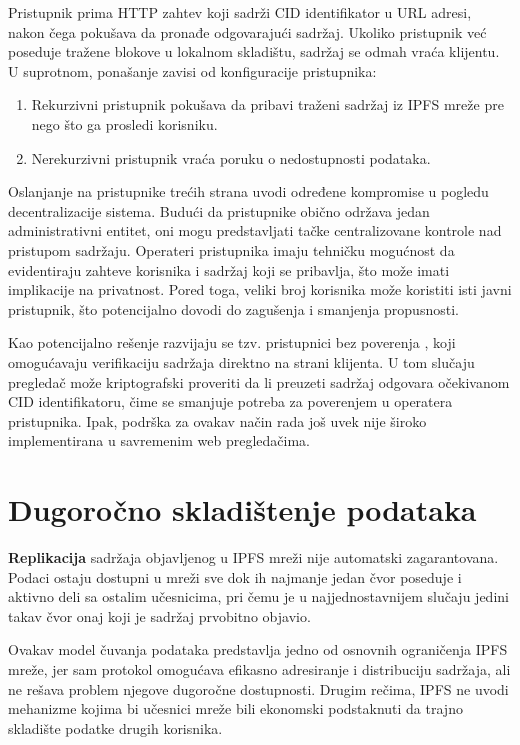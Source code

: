 Pristupnik prima HTTP zahtev koji sadrži CID identifikator u URL adresi, nakon čega pokušava da pronađe odgovarajući sadržaj. Ukoliko pristupnik već poseduje tražene blokove u lokalnom skladištu, sadržaj se odmah vraća klijentu. U suprotnom, ponašanje zavisi od konfiguracije pristupnika:
\begin{enumerate}
\item Rekurzivni pristupnik pokušava da pribavi traženi sadržaj iz IPFS mreže pre nego što ga prosledi korisniku.
\item Nerekurzivni pristupnik vraća poruku o nedostupnosti podataka.
\end{enumerate}

Oslanjanje na pristupnike trećih strana uvodi određene kompromise u pogledu decentralizacije sistema. Budući da pristupnike obično održava jedan administrativni entitet, oni mogu predstavljati tačke centralizovane kontrole nad pristupom sadržaju. Operateri pristupnika imaju tehničku mogućnost da evidentiraju zahteve korisnika i sadržaj koji se pribavlja, što može imati implikacije na privatnost. Pored toga, veliki broj korisnika može koristiti isti javni pristupnik, što potencijalno dovodi do zagušenja i smanjenja propusnosti.

Kao potencijalno rešenje razvijaju se tzv. pristupnici bez poverenja , koji omogućavaju verifikaciju sadržaja direktno na strani klijenta. U tom slučaju pregledač može kriptografski proveriti da li preuzeti sadržaj odgovara očekivanom CID identifikatoru, čime se smanjuje potreba za poverenjem u operatera pristupnika. Ipak, podrška za ovakav način rada još uvek nije široko implementirana u savremenim web pregledačima.

\section{Dugoročno skladištenje podataka}
\textbf{Replikacija} sadržaja objavljenog u IPFS mreži nije automatski zagarantovana. Podaci ostaju dostupni u mreži sve dok ih najmanje jedan čvor poseduje i aktivno deli sa ostalim učesnicima, pri čemu je u najjednostavnijem slučaju jedini takav čvor onaj koji je sadržaj prvobitno objavio.

Ovakav model čuvanja podataka predstavlja jedno od osnovnih ograničenja IPFS mreže, jer sam protokol omogućava efikasno adresiranje i distribuciju sadržaja, ali ne rešava problem njegove dugoročne dostupnosti. Drugim rečima, IPFS ne uvodi mehanizme kojima bi učesnici mreže bili ekonomski podstaknuti da trajno skladište podatke drugih korisnika.


